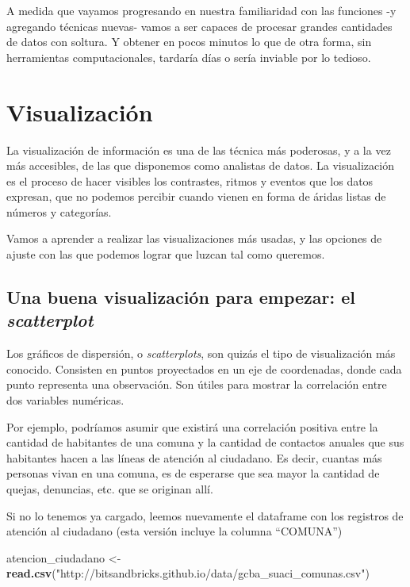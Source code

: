 \documentclass[]{book}
\newenvironment{Shaded}{\begin{snugshade}}{\end{snugshade}}
\newcommand{\KeywordTok}[1]{\textcolor[rgb]{0.13,0.29,0.53}{\textbf{#1}}}
\newcommand{\StringTok}[1]{\textcolor[rgb]{0.31,0.60,0.02}{#1}}
\newcommand{\NormalTok}[1]{#1}
\begin{document}
A medida que vayamos progresando en nuestra familiaridad con las
funciones -y agregando técnicas nuevas- vamos a ser capaces de procesar
grandes cantidades de datos con soltura. Y obtener en pocos minutos lo
que de otra forma, sin herramientas computacionales, tardaría días o
sería inviable por lo tedioso.

\chapter{Visualización}\label{visualizacion}

La visualización de información es una de las técnica más poderosas, y a
la vez más accesibles, de las que disponemos como analistas de datos. La
visualización es el proceso de hacer visibles los contrastes, ritmos y
eventos que los datos expresan, que no podemos percibir cuando vienen en
forma de áridas listas de números y categorías.

Vamos a aprender a realizar las visualizaciones más usadas, y las
opciones de ajuste con las que podemos lograr que luzcan tal como
queremos.

\section{\texorpdfstring{Una buena visualización para empezar: el
\emph{scatterplot}}{Una buena visualización para empezar: el scatterplot}}\label{una-buena-visualizacion-para-empezar-el-scatterplot}

Los gráficos de dispersión, o \emph{scatterplots}, son quizás el tipo de
visualización más conocido. Consisten en puntos proyectados en un eje de
coordenadas, donde cada punto representa una observación. Son útiles
para mostrar la correlación entre dos variables numéricas.

Por ejemplo, podríamos asumir que existirá una correlación positiva
entre la cantidad de habitantes de una comuna y la cantidad de contactos
anuales que sus habitantes hacen a las líneas de atención al ciudadano.
Es decir, cuantas más personas vivan en una comuna, es de esperarse que
sea mayor la cantidad de quejas, denuncias, etc. que se originan allí.

Si no lo tenemos ya cargado, leemos nuevamente el dataframe con los
registros de atención al ciudadano (esta versión incluye la columna
``COMUNA'')

\begin{Shaded}
\begin{Highlighting}[]
\NormalTok{atencion_ciudadano <-}\StringTok{ }\KeywordTok{read.csv}\NormalTok{(}\StringTok{"http://bitsandbricks.github.io/data/gcba_suaci_comunas.csv"}\NormalTok{)}
\end{Highlighting}
\end{Shaded}
\end{document}
